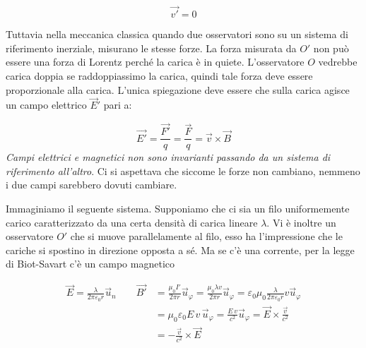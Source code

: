 \[
	\vec{v'}=0
\]

Tuttavia nella meccanica classica quando due osservatori sono su un sistema di riferimento inerziale, misurano le stesse forze. La forza misurata da $O'$ non può essere una forza di Lorentz perché la carica è in quiete. L'osservatore $O$ vedrebbe carica doppia se raddoppiassimo la carica, quindi tale forza deve essere proporzionale alla carica. L'unica spiegazione deve essere che sulla carica agisce un campo elettrico $\vec{E}'$ pari a:

\[
	\vec{E'} = \frac{\vec{F'}}{q} = \frac{\vec{F}}{q} = \vec{v} \times \vec{B}
\]
\emph{Campi elettrici e magnetici non sono invarianti passando da un sistema di riferimento all'altro}. Ci si aspettava che siccome le forze non cambiano, nemmeno i due campi sarebbero dovuti cambiare.

Immaginiamo il seguente sistema. Supponiamo che ci sia un filo uniformemente carico caratterizzato da una certa densità di carica lineare $\lambda$. Vi è inoltre un osservatore $O'$ che si muove parallelamente al filo, esso ha l'impressione che le cariche si spostino in direzione opposta a sé. Ma se c'è una corrente, per la legge di Biot-Savart c'è un campo magnetico

\begin{align*}
	\vec{E} = \frac{\lambda}{2\pi \varepsilon_0 r} \vec{u}_n \qquad \vec{B'} &= \frac{\mu_0 I'}{2\pi r} \vec{u}_{\varphi} = \frac{\mu_0 \lambda v}{2\pi r} \vec{u}_{\varphi} = \varepsilon_0 \mu_0 \frac{\lambda}{2\pi \varepsilon_0 r} v \vec{u}_{\varphi} \\
	&= \mu_0 \varepsilon_0 E \, v \, \vec{u}_{\varphi} = \frac{E\,v}{c^2}\vec{u}_{\varphi} = \vec{E} \times \frac{\vec{v}}{c^2} \\
	&= - \frac{\vec{v}}{c^2} \times \vec{E}
\end{align*}

